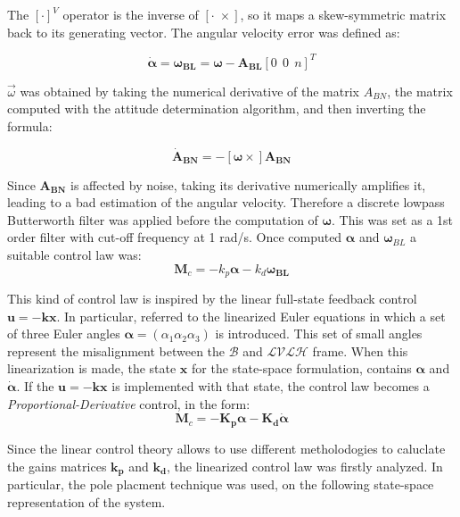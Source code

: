 The $[\cdot]^V$ operator is the inverse of $[\cdot \; \times]$, so it maps a skew-symmetric matrix back to its generating vector. 
The angular velocity error was defined as:

\begin{equation} \label{eq:alpha_dot}
    \boldsymbol{\dot{\alpha}} = \boldsymbol{\omega_{BL}}=\boldsymbol{\omega}-\boldsymbol{A_{BL}}[0 \ \ 0 \ \ n]^T
\end{equation}

$\Vec{\omega}$ was obtained by taking the numerical derivative of the matrix $A_{BN}$, the matrix computed with the attitude determination algorithm, and then inverting the formula:

\begin{equation}
    \boldsymbol{\dot{A}_{BN}} = -[\boldsymbol{\omega} \times] \boldsymbol{A_{BN}}
\end{equation}

Since $\boldsymbol{A_{BN}}$ is affected by noise, taking its derivative numerically amplifies it, leading to a bad estimation of the angular velocity. Therefore a discrete lowpass Butterworth filter was applied before the computation of $\boldsymbol{\omega}$. This was set as a 1st order filter with cut-off frequency at 1 rad/s. Once computed $\boldsymbol{\alpha}$ and $\boldsymbol{\omega}_{BL}$ a suitable control law was: 
$$\boldsymbol{M}_c=-k_p\boldsymbol{\alpha}-k_d\boldsymbol{{\omega}_{BL}}$$

This kind of control law is inspired by the linear full-state feedback control  $\boldsymbol{u} = -\boldsymbol{kx} $. In particular, referred to the linearized Euler equations in which a set of three Euler angles $\boldsymbol{\alpha} = \left(\alpha_1 \alpha_2 \alpha_3 \right)$ is introduced. This set of small angles represent the misalignment between the $\mathcal{B}$ and $\mathcal{LVLH}$ frame. When this linearization is made, the state $\boldsymbol{x}$ for the state-space formulation, contains $\boldsymbol{\alpha}$ and $\dot{\boldsymbol{\alpha}}$. If the $\boldsymbol{u} = -\boldsymbol{kx} $ is implemented with that state, the control law becomes a \textit{Proportional-Derivative} control, in the form:
$$\boldsymbol{M}_c=-\boldsymbol{K_p}\boldsymbol{\alpha}-\boldsymbol{K_d}\dot{\boldsymbol{\alpha}}$$

Since the linear control theory allows to use different metholodogies to caluclate the gains matrices $\boldsymbol{k_p}$ and $\boldsymbol{k_d}$, the linearized control law was firstly analyzed. In particular, the pole placment technique was used, on the following state-space representation of the system. 

